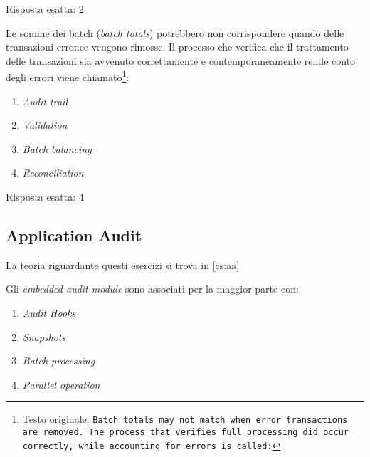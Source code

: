 \begin{Answer} [
  ref={esCs2},
  number={2}
  ]

  \Question Risposta esatta: 2
\end{Answer}

\begin{Exercise} [
  title={Quiz},
  label={esCs3}
  ]

  \Question Le somme dei batch (\textit{batch totals}) potrebbero non
corrispondere quando delle transazioni erronee vengono rimosse.
Il processo che verifica che il trattamento delle transazioni sia
avvenuto correttamente e contemporaneamente rende conto degli errori
viene chiamato\footnote{Testo originale: \texttt{Batch totals may not
match when error transactions are removed. The process that verifies
full processing did occur correctly, while accounting for errors is
called:}}:

\begin{enumerate}
\item \textit{Audit trail}
\item \textit{Validation}
\item \textit{Batch balancing}
\item \textit{Reconciliation}
\end{enumerate}


\end{Exercise}

\begin{Answer} [
  ref={esCs3},
  number={3}
  ]

  \Question Risposta esatta: 4
\end{Answer}


\subsection{Application Audit}
\label{esCs:aa}

La teoria riguardante questi esercizi si trova in \ref{cs:aa}


\begin{Exercise} [
  title={Quiz},
  label={esCs4}
  ]

  \Question Gli \textit{embedded audit module} sono associati per la maggior parte con:
\begin{enumerate}
\item \textit{Audit Hooks}
\item \textit{Snapshots}
\item \textit{Batch processing}
\item \textit{Parallel operation}
\end{enumerate}



\end{Exercise}

